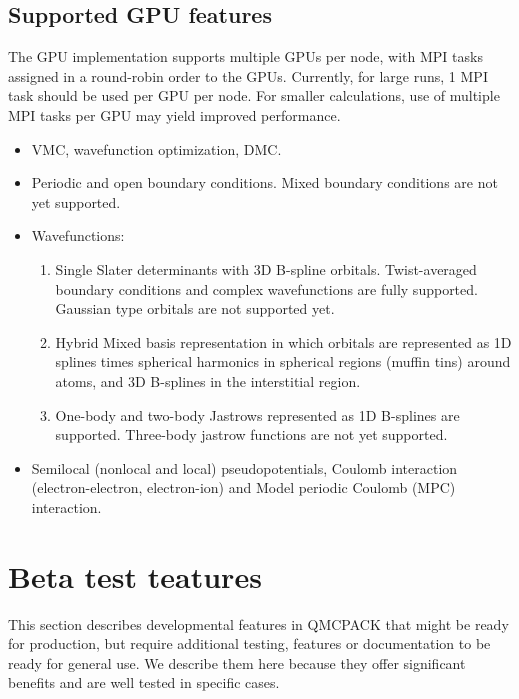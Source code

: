 \subsection{Supported GPU features}

The GPU implementation supports multiple GPUs per node, with MPI tasks assigned
in a round-robin order to the GPUs. Currently, for large runs, 1 MPI task should
be used per GPU per node. For smaller calculations, use of multiple
MPI tasks per GPU may yield improved performance.

\begin{itemize}
  \item VMC, wavefunction optimization, DMC.
  \item Periodic and open boundary conditions. Mixed boundary conditions are not yet supported.
  \item Wavefunctions:
    \begin{enumerate}
        \item Single Slater determinants with 3D B-spline orbitals. Twist-averaged boundary conditions and complex wavefunctions are fully supported. Gaussian type orbitals are not supported yet.
        \item Hybrid Mixed basis representation in which orbitals are represented as 1D splines times spherical harmonics in spherical regions (muffin tins) around atoms, and 3D B-splines in the interstitial region.
        \item One-body and two-body Jastrows represented as 1D
          B-splines are supported. Three-body jastrow functions are
          not yet supported.
    \end{enumerate}
  \item Semilocal (nonlocal and local) pseudopotentials, Coulomb interaction (electron-electron, electron-ion) and Model periodic Coulomb (MPC) interaction.
\end{itemize}

\section{Beta test teatures}

This section describes developmental features in QMCPACK that might be
ready for production, but require additional testing, features or
documentation to be ready for general use. We describe them here
because they offer significant benefits and are well tested in
specific cases.

